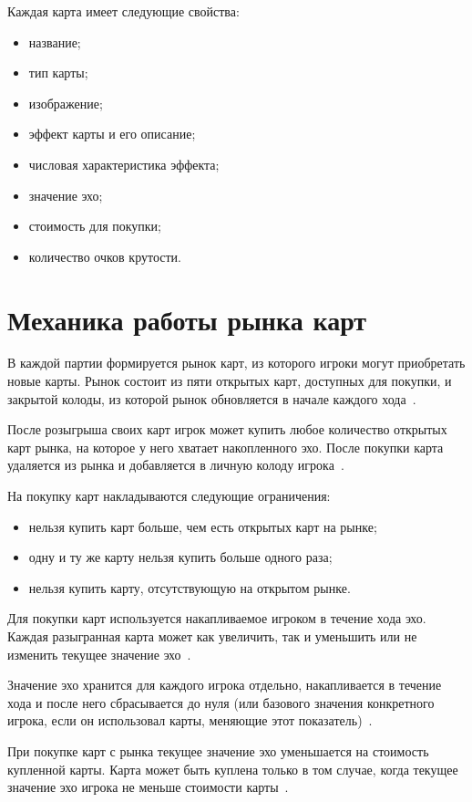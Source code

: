 Каждая карта имеет следующие свойства:
\begin{itemize}
    \item название;
    \item тип карты;
    \item изображение;
    \item эффект карты и его описание;
    \item числовая характеристика эффекта;
    \item значение эхо;
    \item стоимость для покупки;
    \item количество очков крутости.
\end{itemize}


\section{Механика работы рынка карт}

В каждой партии формируется рынок карт, из которого игроки могут приобретать новые карты. Рынок состоит из пяти открытых карт, доступных для покупки, и закрытой колоды, из которой рынок обновляется в начале каждого хода~\cite{rules}.

После розыгрыша своих карт игрок может купить любое количество открытых карт рынка, на которое у него хватает накопленного эхо. После покупки карта удаляется из рынка и добавляется в личную колоду игрока~\cite{rules}.

На покупку карт накладываются следующие ограничения:
\begin{itemize}
    \item нельзя купить карт больше, чем есть открытых карт на рынке;
    \item одну и ту же карту нельзя купить больше одного раза;
    \item нельзя купить карту, отсутствующую на открытом рынке.
\end{itemize}

Для покупки карт используется накапливаемое игроком в течение хода эхо. Каждая разыгранная карта может как увеличить, так и уменьшить или не изменить текущее значение эхо~\cite{rules}.

Значение эхо хранится для каждого игрока отдельно, накапливается в течение хода и после него сбрасывается до нуля (или базового значения конкретного игрока, если он использовал карты, меняющие этот показатель)~\cite{rules}.

При покупке карт с рынка текущее значение эхо уменьшается на стоимость купленной карты. Карта может быть куплена только в том случае, когда текущее значение эхо игрока не меньше стоимости карты~\cite{rules}.

